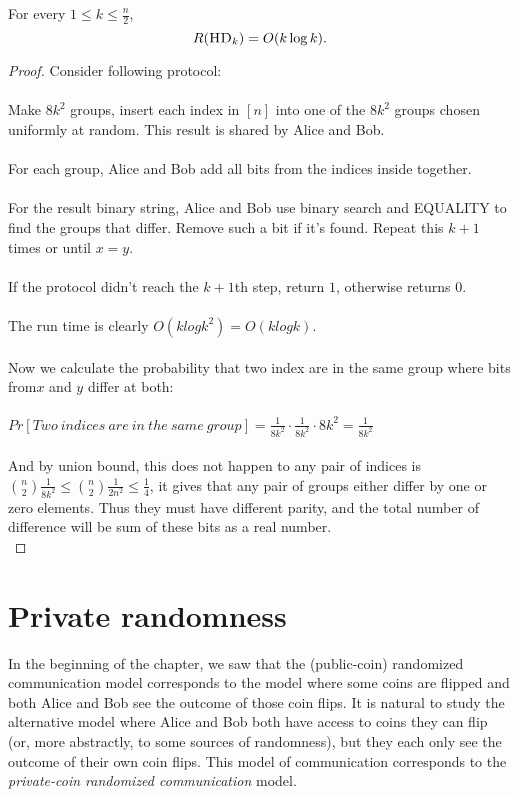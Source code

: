 \begin{theorem}
	For every $1 \le k \le \frac n2$,
	\[
	R(\textsc{HD}_k) = O( k \log k).
	\]
\end{theorem}

\begin{proof}
	Consider following protocol:\\
	\\
	Make $8k^2$ groups, insert each index in $[n]$ into one of the $8k^2$ groups chosen uniformly at random. This result is shared by Alice and Bob.\\
	\\
	For each group, Alice and Bob add all bits from the indices inside together.\\
	\\
	For the result binary string, Alice and Bob use binary search and EQUALITY to find the groups that differ. Remove such a bit if it's found. Repeat this $k+1$ times or until $x=y$.\\
	\\
	If the protocol didn't reach the $k+1$th step, return $1$, otherwise returns 0.\\
	\\
	The run time is clearly $O(klogk^2) = O(klogk)$.\\
	\\
	Now we calculate the probability that two index are in the same group where bits from$x$ and $y$ differ at both: \\
	\\
	$Pr[Two\ indices\ are\ in\ the\ same\ group] = \frac{1}{8k^2}\cdot\frac{1}{8k^2}\cdot8k^2 = \frac{1}{8k^2}$ \\
	\\
	And by union bound, this does not happen to any pair of indices is $\binom{n}{2}\frac{1}{8k^2} \leq \binom{n}{2}\frac{1}{2n^2} \leq \frac14$, it gives that any pair of groups either differ by one or zero elements. Thus they must have different parity, and the total number of difference will be sum of these bits as a real number. \\
\end{proof}



\section{Private randomness}

In the beginning of the chapter, we saw that the (public-coin) randomized communication model corresponds to the model where some coins are flipped and both Alice and Bob see the outcome of those coin flips. It is natural to study the alternative model where Alice and Bob both have access to coins they can flip (or, more abstractly, to some sources of randomness), but they each only see the outcome of their own coin flips. This model of communication corresponds to the \emph{private-coin randomized communication} model.

